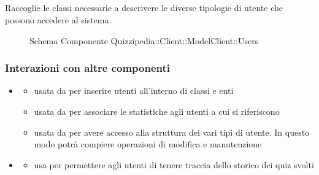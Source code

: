\subsection{}
Raccoglie le classi necessarie a descrivere le diverse tipologie di utente che possono accedere al sistema.
\begin{figure}[H]
\centering
\noindent{}
\caption[Schema Componente Quizzipedia::Client::ModelClient::Users]{Schema Componente Quizzipedia::Client::ModelClient::Users}
\end{figure}
\subsubsection{Interazioni con altre componenti}
\begin{itemize}
\item {}
\begin{itemize}
\item usata da  per inserire utenti all'interno di classi e enti
\item usata da  per associare le statistiche agli utenti a cui si riferiscono
\item usata da  per avere accesso alla struttura dei vari tipi di utente. In questo modo potrà compiere operazioni di modifica e manutenzione
\end{itemize}
\item {}
\begin{itemize}
\item usa  per permettere agli utenti di tenere traccia dello storico dei quiz svolti
\end{itemize}
\end{itemize}
